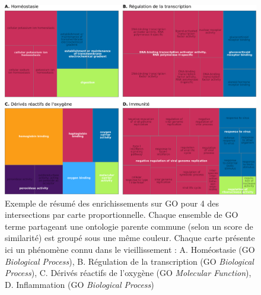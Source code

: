 \begin{figure}[ht]
    \centering
    \includegraphics[width=1\textwidth]{img/chap2/chap2_revigo_resume_4_enrich.pdf}
    \caption[Exemple de résumé des enrichissements sur GO pour 4 des intersections par carte proportionnelle]{Exemple de résumé des enrichissements sur GO pour 4 des intersections par carte proportionnelle. Chaque ensemble de GO terme partageant une ontologie parente commune (selon un score de similarité) est groupé sous une même couleur. Chaque carte présente ici un phénomène connu dans le vieillissement : A. Homéostasie (GO \textit{Biological Process}), B. Régulation de la transcription (GO \textit{Biological Process}), C. Dérivés réactifs de l'oxygène (GO \textit{Molecular Function}), D. Inflammation (GO \textit{Biological Process}) }
    \label{figure:revigo_resume_4_enrich}
\end{figure}

